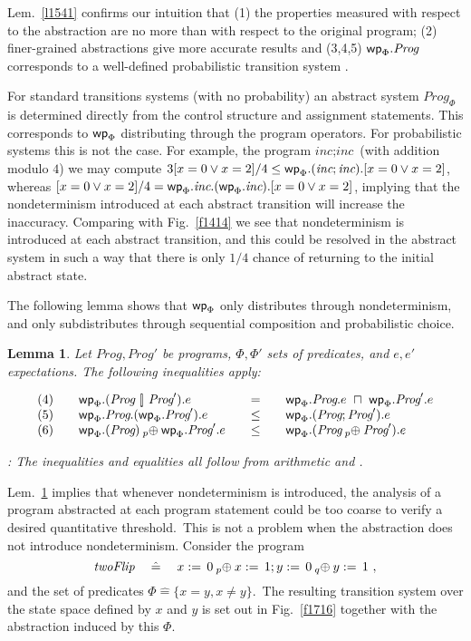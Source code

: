 \documentclass[numbers,copyright,creativecommons]{eptcs}
\newcommand{\figg}[1]{Fig.~\ref{#1}}
\newcommand{\Gets}{:=\,}
\newcommand{\PC}[1]{\mathbin{\makebox[0em]{~}_{#1}\oplus}}
\newcommand{\Ch}{\ [\!] \ }
\newcommand{\Wp}{\mbox{\sf wp}}
\newcommand{\Min}{~\sqcap~}
\newcommand{\Prog}{\textit{Prog}}
\newcommand{\Defs}{\mathrel{\hat{=}}}
\newcommand{\Wide}[1]{~~~#1~~~}
\newtheorem{Lems}{Lemma} \newcommand{\Lem}[1]{Lem.~\ref{#1}}
\newcommand{\Proof}{\noindent{\bf Proof}: \quad}
\begin{document}
\Lem{l1541} confirms our intuition that (1) the properties measured with respect to the abstraction are no more than with respect to the original program; (2) finer-grained abstractions give more accurate results and (3,4,5) $\Wp_\Phi.\Prog$ corresponds to a well-defined probabilistic transition system \cite{ARP}.

For standard transitions systems (with no probability) an abstract system $\Prog_\Phi$ is determined directly from the control structure and assignment statements. This corresponds to $\Wp_\Phi$ distributing through the program operators.  For probabilistic systems this is not the case. For example, the program $\textit{inc};\textit{inc}$ (with addition modulo $4$) we may compute $3[x=0 \lor x=2]/4 \leq \Wp_\Phi.(\textit{inc};\textit{inc}).[x=0 \lor x=2]$, whereas $[x=0 \lor x=2]/4 =\Wp_\Phi.\textit{inc}. (\Wp_\Phi.\textit{inc}).[x=0 \lor x=2]$, implying that the nondeterminism introduced at each abstract transition will increase the inaccuracy. Comparing with \figg{f1414} we see that nondeterminism is introduced at each abstract transition, and this could be resolved in the abstract system in such a way that there is only $1/4$ chance of returning to the initial abstract state.

 The following lemma shows that $\Wp_\Phi$ only distributes through nondeterminism, and only subdistributes through sequential composition and probabilistic choice.

\begin{Lems}\label{l1508}
Let $\Prog, \Prog'$ be  programs, $\Phi, \Phi'$  sets of predicates, and $e, e'$ expectations. The following inequalities apply:

\[
\begin{array}{llll}
(4)~~~ & \Wp_\Phi.(\Prog \Ch \Prog') .e  &\Wide{=}& \Wp_\Phi.\Prog.e  \Min \Wp_\Phi.\Prog'.e \\

(5)~~~ & \Wp_\Phi.\Prog . (\Wp_\Phi. \Prog') .e  &\Wide{\leq}& \Wp_\Phi.(\Prog ; \Prog') .e \\

(6)~~~ &  \Wp_\Phi.(\Prog) \PC{p} \Wp_\Phi. \Prog' .e  &\Wide{\leq}& \Wp_\Phi.(\Prog \PC{p} \Prog') .e \\
\end{array}
\]

\Proof
The inequalities and equalities all follow from arithmetic and .
\end{Lems}

\Lem{l1508} implies that whenever nondeterminism is introduced, the analysis of a program abstracted at each program statement could be too coarse to verify a desired quantitative threshold.\ This is not a problem when the abstraction
does not introduce nondeterminism. Consider the program
\begin{equation}\label{e1720}
\textit{twoFlip} \Wide{\Defs} x \Gets 0 \PC{p} x \Gets 1 ;  y \Gets 0 \PC{q} y \Gets 1~,
\end{equation}
and the set of predicates $\Phi \Defs \{x=y, x \neq y\}$.\ The resulting transition system over the state space defined by $x$ and $y$ is set out in \figg{f1716} together with the abstraction induced by this $\Phi$.
\end{document}
